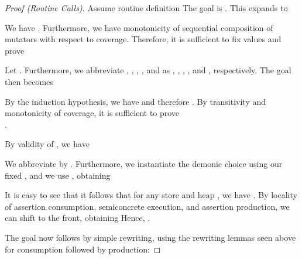 \documentclass{CSML}
\theoremstyle{definition}\newtheorem{notation}[thm]{Notation}
\theoremstyle{plain}\newtheorem{satz}[thm]{Satz}
\begin{document}
\begin{proof}[Proof (Routine Calls)]
Assume routine definition 
The goal is .
This expands to

We have .
Furthermore, we have monotonicity of sequential composition of mutators with respect to coverage.
Therefore, it is sufficient to fix values  and prove

Let .
Furthermore, we abbreviate , , ,
, and  as , , , , and , respectively.
The goal then becomes 

By the induction hypothesis, we have  and therefore
. By transitivity and monotonicity of coverage, it is sufficient
to prove\\
.

By validity of , we have

We abbreviate  by .
Furthermore, we instantiate the demonic choice using our fixed , and we use , obtaining

It is easy to see that it follows that for any store  and heap , we have
.
By locality of assertion consumption, semiconcrete execution, and assertion production, we can shift  to the front,
obtaining 
Hence,
.

The goal now follows by simple rewriting, using the rewriting lemmas seen above for consumption followed by production:

\end{proof}
\end{document}
